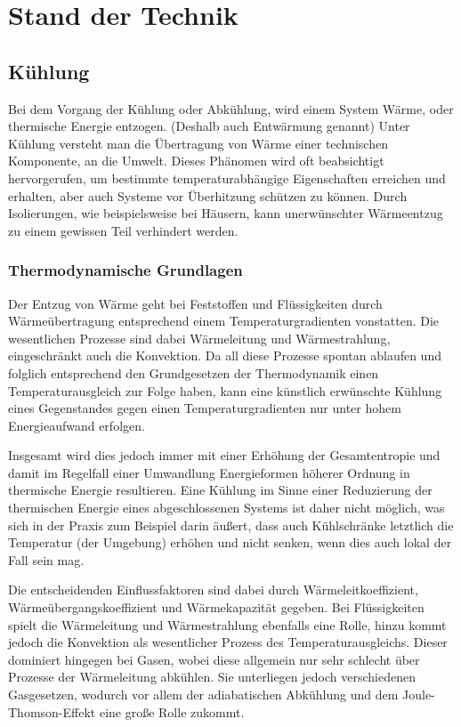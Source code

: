 \chapter{Stand der Technik}


\section{Kühlung} 

Bei dem Vorgang der Kühlung oder Abkühlung, wird einem System Wärme, oder thermische Energie entzogen. (Deshalb auch Entwärmung genannt)
Unter Kühlung versteht man die Übertragung von Wärme einer technischen Komponente, an die Umwelt. Dieses Phänomen wird oft beabsichtigt hervorgerufen, um bestimmte temperaturabhängige Eigenschaften erreichen und erhalten, aber auch Systeme vor Überhitzung schützen zu können. 
Durch Isolierungen, wie beispielsweise bei Häusern, kann unerwünschter Wärmeentzug zu einem gewissen Teil verhindert werden.

\subsection{Thermodynamische Grundlagen}

Der Entzug von Wärme geht bei Feststoffen und Flüssigkeiten durch Wärmeübertragung entsprechend einem Temperaturgradienten vonstatten. Die wesentlichen Prozesse sind dabei Wärmeleitung und Wärmestrahlung, eingeschränkt auch die Konvektion. Da all diese Prozesse spontan ablaufen und folglich entsprechend den Grundgesetzen der Thermodynamik einen Temperaturausgleich zur Folge haben, kann eine künstlich erwünschte Kühlung eines Gegenstandes gegen einen Temperaturgradienten nur unter hohem Energieaufwand erfolgen. 

Insgesamt wird dies jedoch immer mit einer Erhöhung der Gesamtentropie und damit im Regelfall einer Umwandlung Energieformen höherer Ordnung in thermische Energie resultieren. Eine Kühlung im Sinne einer Reduzierung der thermischen Energie eines abgeschlossenen Systems ist daher nicht möglich, was sich in der Praxis zum Beispiel darin äußert, dass auch Kühlschränke letztlich die Temperatur (der Umgebung) erhöhen und nicht senken, wenn dies auch lokal der Fall sein mag.

Die entscheidenden Einflussfaktoren sind dabei durch Wärmeleitkoeffizient, Wärmeübergangskoeffizient und Wärmekapazität gegeben. Bei Flüssigkeiten spielt die Wärmeleitung und Wärmestrahlung ebenfalls eine Rolle, hinzu kommt jedoch die Konvektion als wesentlicher Prozess des Temperaturausgleichs. Dieser dominiert hingegen bei Gasen, wobei diese allgemein nur sehr schlecht über Prozesse der Wärmeleitung abkühlen. Sie unterliegen jedoch verschiedenen Gasgesetzen, wodurch vor allem der adiabatischen Abkühlung und dem Joule-Thomson-Effekt eine große Rolle zukommt. 

